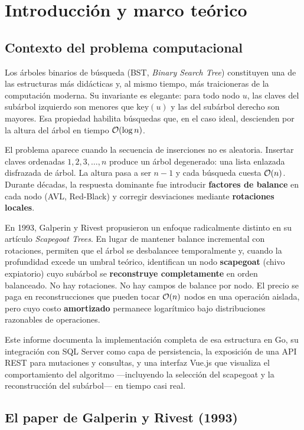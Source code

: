 \chapter{Introducción y marco teórico}

\section{Contexto del problema computacional}

Los árboles binarios de búsqueda (BST, \textit{Binary Search Tree}) constituyen una de las estructuras más didácticas y, al mismo tiempo, más traicioneras de la computación moderna. Su invariante es elegante: para todo nodo $u$, las claves del subárbol izquierdo son menores que $\mathrm{key}(u)$ y las del subárbol derecho son mayores. Esa propiedad habilita búsquedas que, en el caso ideal, descienden por la altura del árbol en tiempo $\mathcal{O}(\log n)$.

El problema aparece cuando la secuencia de inserciones no es aleatoria. Insertar claves ordenadas $1, 2, 3, \ldots, n$ produce un árbol degenerado: una lista enlazada disfrazada de árbol. La altura pasa a ser $n-1$ y cada búsqueda cuesta $\mathcal{O}(n)$. Durante décadas, la respuesta dominante fue introducir \textbf{factores de balance} en cada nodo (AVL, Red-Black) y corregir desviaciones mediante \textbf{rotaciones locales}.

En 1993, Galperin y Rivest propusieron un enfoque radicalmente distinto en su artículo \textit{Scapegoat Trees}. En lugar de mantener balance incremental con rotaciones, permiten que el árbol se desbalancee temporalmente y, cuando la profundidad excede un umbral teórico, identifican un nodo \textbf{scapegoat} (chivo expiatorio) cuyo subárbol se \textbf{reconstruye completamente} en orden balanceado. No hay rotaciones. No hay campos de balance por nodo. El precio se paga en reconstrucciones que pueden tocar $\mathcal{O}(n)$ nodos en una operación aislada, pero cuyo costo \textbf{amortizado} permanece logarítmico bajo distribuciones razonables de operaciones.

Este informe documenta la implementación completa de esa estructura en Go, su integración con SQL Server como capa de persistencia, la exposición de una API REST para mutaciones y consultas, y una interfaz Vue.js que visualiza el comportamiento del algoritmo ---incluyendo la selección del scapegoat y la reconstrucción del subárbol--- en tiempo casi real.

\section{El paper de Galperin y Rivest (1993)}

